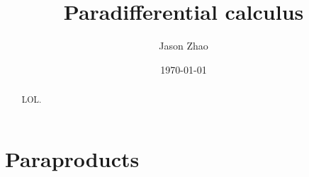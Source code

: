 \documentclass[reqno]{amsart}
\title
{
	Paradifferential calculus
}
\author{Jason Zhao}
\date{\today}
\begin{document}
\begin{abstract}
	LOL. \cite{Stein16}
\end{abstract}
\maketitle

\tableofcontents

\section{Paraproducts}




\end{document}
